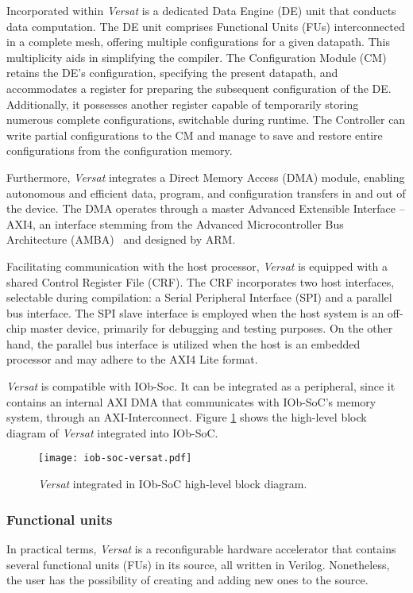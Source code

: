 Incorporated within \textit{Versat} is a dedicated Data Engine (DE) unit that conducts data computation. The DE unit comprises Functional Units (FUs) interconnected in a complete mesh, offering multiple configurations for a given datapath. This multiplicity aids in simplifying the compiler.
The Configuration Module (CM) retains the DE's configuration, specifying the present datapath, and accommodates a register for preparing the subsequent configuration of the DE. Additionally, it possesses another register capable of temporarily storing numerous complete configurations, switchable during runtime. The Controller can write partial configurations to the CM and manage to save and restore entire configurations from the configuration memory.

Furthermore, \textit{Versat} integrates a Direct Memory Access (DMA) module, enabling autonomous and efficient data, program, and configuration transfers in and out of the device. The DMA operates through a master Advanced Extensible Interface – AXI4, an interface stemming from the Advanced Microcontroller Bus Architecture (AMBA)~\cite{bib:axi_amba} and designed by ARM.

Facilitating communication with the host processor, \textit{Versat} is equipped with a shared Control Register File (CRF). The CRF incorporates two host interfaces, selectable during compilation: a Serial Peripheral Interface (SPI) and a parallel bus interface. The SPI slave interface is employed when the host system is an off-chip master device, primarily for debugging and testing purposes. On the other hand, the parallel bus interface is utilized when the host is an embedded processor and may adhere to the AXI4 Lite format.

\textit{Versat} is compatible with IOb-Soc. It can be integrated as a peripheral, since it contains an internal AXI DMA that communicates with IOb-SoC's memory system, through an AXI-Interconnect. Figure \ref{fig:iobversat} shows the high-level block diagram of \textit{Versat} integrated into IOb-SoC.

\vspace{0.1cm}

\begin{figure}[H]
\centerline{\texttt{[image: iob-soc-versat.pdf]}}
\caption{\textit{Versat} integrated in IOb-SoC high-level block diagram.}
\label{fig:iobversat}
\end{figure}

\subsubsection{Functional units}
In practical terms, \textit{Versat} is a reconfigurable hardware accelerator that contains several functional units (FUs) in its source, all written in Verilog. Nonetheless, the user has the possibility of creating and adding new ones to the source.



